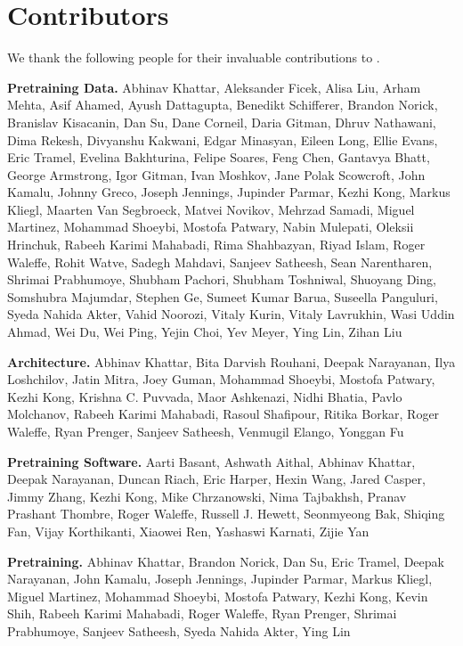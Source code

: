 \section*{Contributors}

We thank the following people for their invaluable contributions to \ourmodelfull.

\textbf{Pretraining Data.} Abhinav Khattar, Aleksander Ficek, Alisa Liu, Arham Mehta, Asif Ahamed, Ayush Dattagupta, Benedikt Schifferer, Brandon Norick, Branislav Kisacanin, Dan Su, Dane Corneil, Daria Gitman, Dhruv Nathawani, Dima Rekesh, Divyanshu Kakwani, Edgar Minasyan, Eileen Long, Ellie Evans, Eric Tramel, Evelina Bakhturina, Felipe Soares, Feng Chen, Gantavya Bhatt, George Armstrong, Igor Gitman, Ivan Moshkov, Jane Polak Scowcroft, John Kamalu, Johnny Greco, Joseph Jennings, Jupinder Parmar, Kezhi Kong, Markus Kliegl, Maarten Van Segbroeck, Matvei Novikov, Mehrzad Samadi, Miguel Martinez, Mohammad Shoeybi, Mostofa Patwary, Nabin Mulepati, Oleksii Hrinchuk, Rabeeh Karimi Mahabadi, Rima Shahbazyan, Riyad Islam, Roger Waleffe, Rohit Watve, Sadegh Mahdavi, Sanjeev Satheesh, Sean Narentharen, Shrimai Prabhumoye, Shubham Pachori, Shubham Toshniwal, Shuoyang Ding, Somshubra Majumdar, Stephen Ge, Sumeet Kumar Barua, Suseella Panguluri, Syeda Nahida Akter, Vahid Noorozi, Vitaly Kurin, Vitaly Lavrukhin, Wasi Uddin Ahmad, Wei Du, Wei Ping, Yejin Choi, Yev Meyer, Ying Lin, Zihan Liu

\textbf{Architecture.} Abhinav Khattar, Bita Darvish Rouhani, Deepak Narayanan, Ilya Loshchilov, Jatin Mitra, Joey Guman, Mohammad Shoeybi, Mostofa Patwary, Kezhi Kong, Krishna C. Puvvada, Maor Ashkenazi, Nidhi Bhatia, Pavlo Molchanov, Rabeeh Karimi Mahabadi, Rasoul Shafipour, Ritika Borkar, Roger Waleffe, Ryan Prenger, Sanjeev Satheesh, Venmugil Elango, Yonggan Fu

\textbf{Pretraining Software.} Aarti Basant, Ashwath Aithal, Abhinav Khattar, Deepak Narayanan, Duncan Riach, Eric Harper, Hexin Wang, Jared Casper, Jimmy Zhang, Kezhi Kong, Mike Chrzanowski, Nima Tajbakhsh, Pranav Prashant Thombre, Roger Waleffe, Russell J. Hewett, Seonmyeong Bak, Shiqing Fan, Vijay Korthikanti, Xiaowei Ren, Yashaswi Karnati, Zijie Yan

\textbf{Pretraining.} Abhinav Khattar, Brandon Norick, Dan Su, Eric Tramel, Deepak Narayanan, John Kamalu, Joseph Jennings, Jupinder Parmar, Markus Kliegl, Miguel Martinez, Mohammad Shoeybi, Mostofa Patwary, Kezhi Kong, Kevin Shih, Rabeeh Karimi Mahabadi, Roger Waleffe, Ryan Prenger, Shrimai Prabhumoye, Sanjeev Satheesh, Syeda Nahida Akter, Ying Lin 

